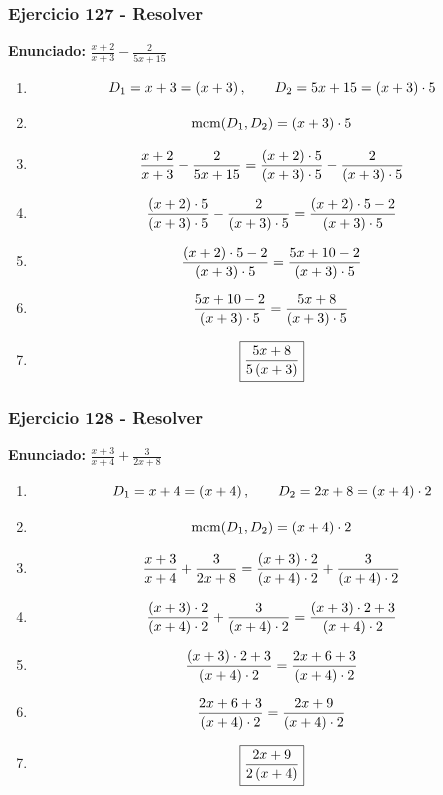 \documentclass[11pt,a4paper]{article}
\newcommand{\fitmath}[1]{%
\[
\setbox0=\hbox{$\displaystyle #1$}%
\ifdim\wd0>\linewidth
\resizebox{\linewidth}{!}{$\displaystyle #1$}%
\else
#1%
\fi
\]
}
\begin{document}
\vspace{0.12cm}
\subsubsection*{Ejercicio 127 - Resolver}
\textbf{Enunciado:} $ \frac{x + 2}{x + 3} - \frac{2}{5 x + 15} $\par
\begin{enumerate}[leftmargin=2em]
\item \fitmath{D_1=x + 3=\left(x + 3\right),\qquad D_2=5 x + 15=\left(x + 3\right)\cdot 5}
\item \fitmath{\operatorname{mcm}(D_1,D_2)=\left(x + 3\right)\cdot 5}
\item \fitmath{\frac{x + 2}{x + 3} - \frac{2}{5 x + 15}= \frac{\left(x + 2\right)\cdot 5}{\left(x + 3\right)\cdot 5} - \frac{2}{\left(x + 3\right)\cdot 5}}
\item \fitmath{\frac{\left(x + 2\right)\cdot 5}{\left(x + 3\right)\cdot 5} - \frac{2}{\left(x + 3\right)\cdot 5}=\frac{\left(x + 2\right)\cdot 5 - 2}{\left(x + 3\right)\cdot 5}}
\item \fitmath{\frac{\left(x + 2\right)\cdot 5 - 2}{\left(x + 3\right)\cdot 5}=\frac{5 x + 10 - 2}{\left(x + 3\right)\cdot 5}}
\item \fitmath{\frac{5 x + 10 - 2}{\left(x + 3\right)\cdot 5}=\frac{5 x + 8}{\left(x + 3\right)\cdot 5}}
\item \fitmath{\boxed{\frac{5 x + 8}{5 \left(x + 3\right)}}}
\end{enumerate}

\vspace{0.12cm}
\subsubsection*{Ejercicio 128 - Resolver}
\textbf{Enunciado:} $ \frac{x + 3}{x + 4} + \frac{3}{2 x + 8} $\par
\begin{enumerate}[leftmargin=2em]
\item \fitmath{D_1=x + 4=\left(x + 4\right),\qquad D_2=2 x + 8=\left(x + 4\right)\cdot 2}
\item \fitmath{\operatorname{mcm}(D_1,D_2)=\left(x + 4\right)\cdot 2}
\item \fitmath{\frac{x + 3}{x + 4} + \frac{3}{2 x + 8}= \frac{\left(x + 3\right)\cdot 2}{\left(x + 4\right)\cdot 2} + \frac{3}{\left(x + 4\right)\cdot 2}}
\item \fitmath{\frac{\left(x + 3\right)\cdot 2}{\left(x + 4\right)\cdot 2} + \frac{3}{\left(x + 4\right)\cdot 2}=\frac{\left(x + 3\right)\cdot 2 + 3}{\left(x + 4\right)\cdot 2}}
\item \fitmath{\frac{\left(x + 3\right)\cdot 2 + 3}{\left(x + 4\right)\cdot 2}=\frac{2 x + 6 + 3}{\left(x + 4\right)\cdot 2}}
\item \fitmath{\frac{2 x + 6 + 3}{\left(x + 4\right)\cdot 2}=\frac{2 x + 9}{\left(x + 4\right)\cdot 2}}
\item \fitmath{\boxed{\frac{2 x + 9}{2 \left(x + 4\right)}}}
\end{enumerate}
\end{document}
